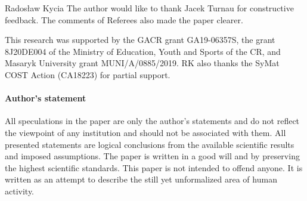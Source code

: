 \begin{artengenv}{Radosław Kycia}
The author would like to thank Jacek Turnau for constructive feedback. The comments of Referees also made the paper clearer.

This research was supported by the GACR grant GA19-06357S, the grant 8J20DE004 of the Ministry of Education, Youth and Sports of the CR, and Masaryk University grant MUNI/A/0885/2019. RK also thanks the SyMat COST Action (CA18223) for partial support.



\paragraph{Author's statement}
All speculations in the paper are only the author's statements and do not reflect the viewpoint of any institution and should not be associated with them. All presented statements are logical conclusions from the available scientific results and imposed assumptions. The paper is written in a good will and by preserving the highest scientific standards. This paper is not intended to offend anyone. It is written as an attempt to describe the still yet unformalized area of human activity.

\end{artengenv}
\label{kycia_ende}



